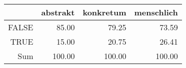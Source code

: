 \begin{tabular}{rrrr}
  \hline
 & abstrakt & konkretum & menschlich \\ 
  \hline
FALSE & 85.00 & 79.25 & 73.59 \\ 
  TRUE & 15.00 & 20.75 & 26.41 \\ 
  Sum & 100.00 & 100.00 & 100.00 \\ 
   \hline
\end{tabular}
